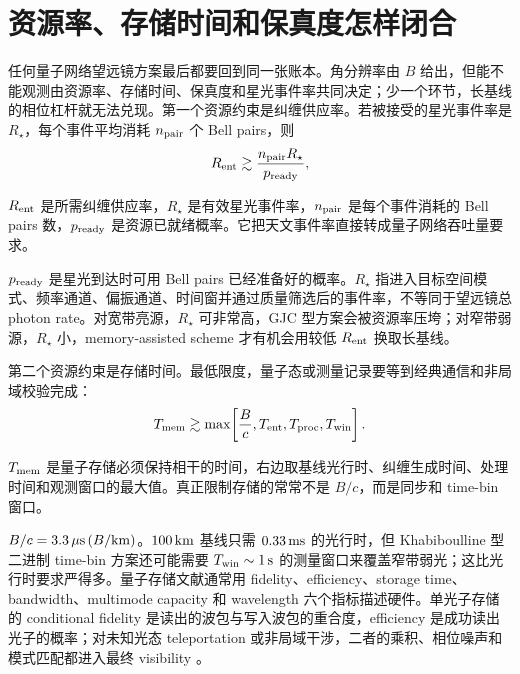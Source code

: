 \section{资源率、存储时间和保真度怎样闭合}

任何量子网络望远镜方案最后都要回到同一张账本。角分辨率由 \(B\) 给出，但能不能观测由资源率、存储时间、保真度和星光事件率共同决定；少一个环节，长基线的相位杠杆就无法兑现。第一个资源约束是纠缠供应率。若被接受的星光事件率是 \(R_\star\)，每个事件平均消耗 \(n_{\rm pair}\) 个 Bell pairs，则
\begin{equation}
  R_{\rm ent}
  \gtrsim
  \frac{n_{\rm pair}R_\star}{p_{\rm ready}},
  \label{eq:ch17-entanglement-rate}
\end{equation}
\begin{formulaexplain}[公式 (17.8) 解读]
\(R_{\rm ent}\) 是所需纠缠供应率，\(R_\star\) 是有效星光事件率，\(n_{\rm pair}\) 是每个事件消耗的 Bell pairs 数，\(p_{\rm ready}\) 是资源已就绪概率。它把天文事件率直接转成量子网络吞吐量要求。
\end{formulaexplain}
\(p_{\rm ready}\) 是星光到达时可用 Bell pairs 已经准备好的概率。\(R_\star\) 指进入目标空间模式、频率通道、偏振通道、时间窗并通过质量筛选后的事件率，不等同于望远镜总 photon rate。对宽带亮源，\(R_\star\) 可非常高，GJC 型方案会被资源率压垮；对窄带弱源，\(R_\star\) 小，memory-assisted scheme 才有机会用较低 \(R_{\rm ent}\) 换取长基线。

第二个资源约束是存储时间。最低限度，量子态或测量记录要等到经典通信和非局域校验完成：
\begin{equation}
  T_{\rm mem}
  \gtrsim
  \max\!\left[
    \frac{B}{c},
    T_{\rm ent},
    T_{\rm proc},
    T_{\rm win}
  \right].
  \label{eq:ch17-memory-time}
\end{equation}
\begin{formulaexplain}[公式 (17.9) 解读]
\(T_{\rm mem}\) 是量子存储必须保持相干的时间，右边取基线光行时、纠缠生成时间、处理时间和观测窗口的最大值。真正限制存储的常常不是 \(B/c\)，而是同步和 time-bin 窗口。
\end{formulaexplain}
\(B/c=3.3\,\mu{\rm s}\,(B/{\rm km})\)。\(100\,{\rm km}\) 基线只需 \(0.33\,{\rm ms}\) 的光行时，但 Khabiboulline 型二进制 time-bin 方案还可能需要 \(T_{\rm win}\sim1\,{\rm s}\) 的测量窗口来覆盖窄带弱光；这比光行时要求严得多。量子存储文献通常用 fidelity、efficiency、storage time、bandwidth、multimode capacity 和 wavelength 六个指标描述硬件。单光子存储的 conditional fidelity 是读出的波包与写入波包的重合度，efficiency 是成功读出光子的概率；对未知光态 teleportation 或非局域干涉，二者的乘积、相位噪声和模式匹配都进入最终 visibility \citep{2009NaPho...3..706L,2010EPJD...58....1S,2016JMOp...63.2005H}。

